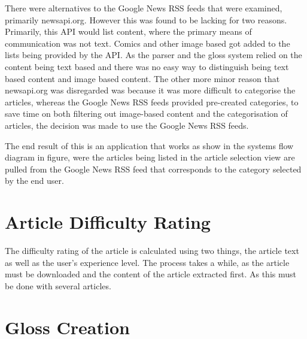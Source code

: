 There were alternatives to the Google News RSS feeds that were examined, primarily newsapi.org. However this was found to be lacking for two reasons. Primarily, this API would list content, where the primary means of communication was not text. Comics and other image based got added to the lists being provided by the API. As the parser and the gloss system relied on the content being text based and there was no easy way to distinguish being text based content and image based content. The other more minor reason that newsapi.org was disregarded was because it was more difficult to categorise the articles, whereas the Google News RSS feeds provided pre-created categories, to save time on both filtering out image-based content and the categorisation of articles, the decision was made to use the Google News RSS feeds. 

The end result of this is an application that works as show in the systems flow diagram in figure, were the articles being listed in the article selection view are pulled from the Google News RSS feed that corresponds to the category selected by the end user.

\section{Article Difficulty Rating}

The difficulty rating of the article is calculated using two things, the article text as well as the user's experience level. The process takes a while, as the article must be downloaded and the content of the article extracted first. As this must be done with several articles. 


\section{Gloss Creation}